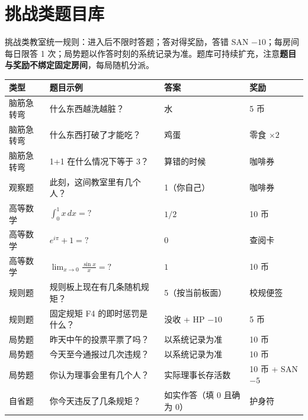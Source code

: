 \documentclass[UTF8, fontset=none, 11pt]{ctexart}
\begin{document}
\clearpage
\section{挑战类题目库}
\label{app:quiz}
挑战类教室统一规则：进入后不限时答题；答对得奖励，答错 SAN $-10$；每房间每日限答 1 次；局势题以作答时刻的系统记录为准。题库可持续扩充，注意\textbf{题目与奖励不绑定固定房间}，每局随机分派。

\begin{longtable}{p{3.2cm}p{7.2cm}p{2.2cm}p{2.6cm}}
\toprule
类型 & 题目示例 & 答案 & 奖励 \\
\midrule
\endhead
脑筋急转弯 & 什么东西越洗越脏？ & 水 & 5 币 \\
脑筋急转弯 & 什么东西打破了才能吃？ & 鸡蛋 & 零食 $\times 2$ \\
脑筋急转弯 & 1+1 在什么情况下等于 3？ & 算错的时候 & 咖啡券 \\
观察题 & 此刻，这间教室里有几个人？ & 1（你自己） & 咖啡券 \\
高等数学 & $\int_0^1 x\,dx=?$ & $1/2$ & 10 币 \\
高等数学 & $e^{i\pi}+1=?$ & $0$ & 查阅卡 \\
高等数学 & $\lim_{x\to0}\frac{\sin x}{x}=?$ & $1$ & 10 币 \\
规则题 & 规则板上现在有几条随机规矩？ & 5（按当前板面） & 校规便签 \\
规则题 & 固定规矩 F4 的即时惩罚是什么？ & 没收 + HP $-10$ & 5 币 \\
局势题 & 昨天中午的投票平票了吗？ & 以系统记录为准 & 10 币 \\
局势题 & 今天至今通报过几次违规？ & 以系统记录为准 & 10 币 \\
局势题 & 你认为理事会里有几个人？ & 实际理事长存活数 & 10 币 + SAN $-5$ \\
自省题 & 你今天违反了几条规矩？ & 如实作答（填 0 且确为 0） & 护身符 \\
\bottomrule
\end{longtable}
\end{document}

